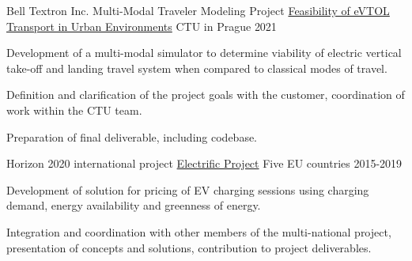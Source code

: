 

\begin{cventries}


  \cventry
    {Bell Textron Inc. Multi-Modal Traveler Modeling Project} %
    {\href{https://www.aic.fel.cvut.cz/projects/passenger-decision-modeling-in-a-multi-modal-urban-environment}{Feasibility of eVTOL Transport in Urban Environments}} %
    {CTU in Prague} %
    {2021} %
    {
      \begin{cvitems} %
        \item {Development of a multi-modal simulator to determine viability of electric vertical take-off and landing travel system when compared to classical modes of travel.}
        \item {Definition and clarification of the project goals with the customer, coordination of work within the CTU team.}
        \item {Preparation of final deliverable, including codebase. }
      \end{cvitems}
    }


  \cventry
    {Horizon 2020 international project} %
    {\href{https://electrific-project.eu/}{Electrific Project}} %
    {Five EU countries} %
    {2015-2019} %
    {
      \begin{cvitems} %
        \item {Development of solution for pricing of EV charging sessions using charging demand, energy availability and greenness of energy.}
        \item {Integration and coordination with other members of the multi-national project, presentation of concepts and solutions, contribution to project deliverables.}
      \end{cvitems}
    }


\end{cventries}
